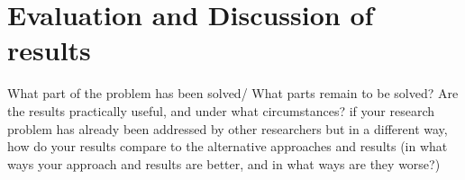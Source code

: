 \chapter{Evaluation and Discussion of results}
\noindent 
What part of the problem has been solved/ What parts remain to be solved? Are the results practically useful, and under what circumstances? if your research problem has already been addressed by other researchers but in a different way, how do your results compare to the alternative approaches and results (in what ways your approach and results are better, and in what ways are they worse?)

